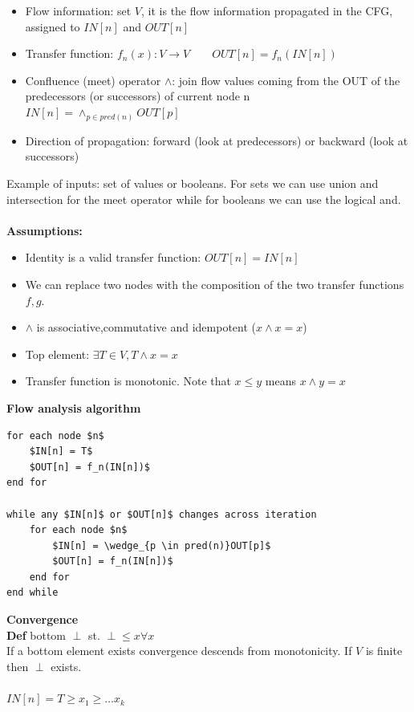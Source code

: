 \documentclass[10pt,a4paper]{article}
\begin{document}
\begin{itemize}
\item Flow information: set $V$, it is the flow information propagated in the CFG, assigned to $IN[n]$ and $OUT[n]$
\item Transfer function: $f_n(x): V \to V \hspace{2em} OUT[n]= f_n(IN[n])$
\item Confluence (meet) operator $\wedge$: join flow values coming from the OUT of the predecessors (or successors) of current node n\\
$ IN[n] = \wedge_{p \in pred(n)}OUT[p]$
\item Direction of propagation: forward (look at predecessors) or backward (look at successors)
\end{itemize}
Example of inputs: set of values or booleans. For sets we can use union and intersection for the meet operator while for booleans we can use the logical and.\\\\
\textbf{Assumptions:}
\begin{itemize}
\item Identity is a valid transfer function: $OUT[n] = IN[n]$
\item We can replace two nodes with the composition of the two transfer functions $f,g$.
\item $\wedge$ is associative,commutative and idempotent ($x \wedge x = x$)
\item Top element: $\exists T \in V,T \wedge x = x$
\item Transfer function is monotonic. Note that $x \leq y$ means $x \wedge y = x$
\end{itemize}
\textbf{Flow analysis algorithm}
\begin{lstlisting}[frame=lines]
for each node $n$
	$IN[n] = T$
	$OUT[n] = f_n(IN[n])$
end for

while any $IN[n]$ or $OUT[n]$ changes across iteration
	for each node $n$
		$IN[n] = \wedge_{p \in pred(n)}OUT[p]$
		$OUT[n] = f_n(IN[n])$
	end for
end while
\end{lstlisting}
\vspace{1em}
\textbf{Convergence}\\
\textbf{Def} bottom $\perp$ st. $\perp \leq x \forall x$\\
If a bottom element exists convergence descends from monotonicity. If $V$ is finite then $\perp$ exists.\\\\
$IN[n] = T \geq x_1 \geq \hdots x_k$\\
\end{document}
